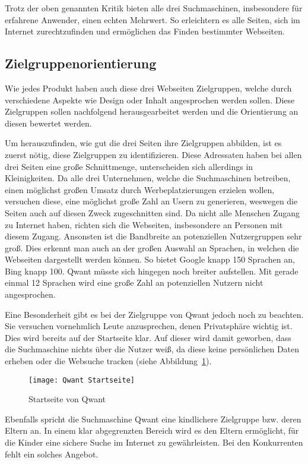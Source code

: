 Trotz der oben genannten Kritik bieten alle drei Suchmaschinen, insbesondere für erfahrene Anwender, einen echten Mehrwert.
So erleichtern es alle Seiten, sich im Internet zurechtzufinden und ermöglichen das Finden bestimmter Webseiten.

\subsection{Zielgruppenorientierung}\label{subsec:zielgruppenorientierung}
Wie jedes Produkt haben auch diese drei Webseiten Zielgruppen, welche durch verschiedene Aspekte wie Design oder Inhalt
angesprochen werden sollen.
Diese Zielgruppen sollen nachfolgend herausgearbeitet werden und die Orientierung an diesen
bewertet werden.

Um herauszufinden, wie gut die drei Seiten ihre Zielgruppen abbilden, ist es zuerst nötig, diese Zielgruppen zu identifizieren.
Diese Adressaten haben bei allen drei Seiten eine große Schnittmenge, unterscheiden sich allerdings in Kleinigkeiten.
Da alle drei Unternehmen, welche die Suchmaschinen betreiben, einen möglichst großen Umsatz durch Werbeplatzierungen
erzielen wollen, versuchen diese, eine möglichst große Zahl an Usern zu generieren, weswegen die Seiten auch auf diesen Zweck zugeschnitten sind.
Da nicht alle Menschen Zugang zu Internet haben, richten sich die Webseiten, insbesondere an Personen mit diesem Zugang.
Ansonsten ist die Bandbreite an potenziellen Nutzergruppen sehr groß.
Dies erkennt man auch an der großen Auswahl an Sprachen, in welchen die Webseiten dargestellt werden können.
So bietet Google knapp 150 Sprachen an, Bing knapp 100.
Qwant müsste sich hingegen noch breiter aufstellen.
Mit gerade einmal 12 Sprachen wird eine große Zahl an
potenziellen Nutzern nicht angesprochen.

Eine Besonderheit gibt es bei der Zielgruppe von Qwant jedoch noch zu beachten.
Sie versuchen vornehmlich Leute anzusprechen, denen Privatsphäre wichtig ist.
Dies wird bereits auf der Startseite klar.
Auf dieser wird damit geworben, dass die Suchmaschine nichts über die Nutzer weiß,
da diese keine persönlichen Daten erheben oder die Websuche tracken (siehe Abbildung~\ref{fig:qwantstartseite}).
\begin{figure}[ht]
    \centering
    \texttt{[image: Qwant Startseite]}
    \caption{Startseite von Qwant}
    \label{fig:qwantstartseite}
\end{figure}

Ebenfalls spricht die Suchmaschine Qwant eine kindlichere Zielgruppe bzw. deren Eltern an.
In einem klar abgegrenzten Bereich wird es den Eltern ermöglicht, für die Kinder eine sichere Suche im Internet zu gewährleisten.
Bei den Konkurrenten fehlt ein solches Angebot.

